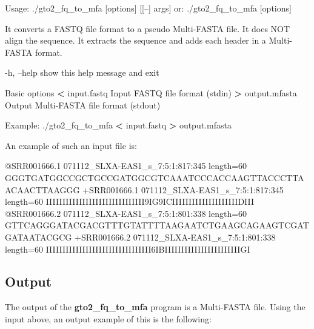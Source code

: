 \documentclass[11pt,]{krantz}
\newenvironment{Shaded}{\begin{snugshade}}{\end{snugshade}}
\newcommand{\OperatorTok}[1]{\textcolor[rgb]{0.43,0.43,0.43}{\textbf{#1}}}
\newcommand{\ExtensionTok}[1]{#1}
\newcommand{\NormalTok}[1]{#1}
\begin{document}
\begin{Shaded}
\begin{Highlighting}[]
\ExtensionTok{Usage}\NormalTok{: ./gto2_fq_to_mfa [options] [[--] args]}
   \ExtensionTok{or}\NormalTok{: ./gto2_fq_to_mfa [options]}

\ExtensionTok{It}\NormalTok{ converts a FASTQ file format to a pseudo Multi-FASTA file.}
\ExtensionTok{It}\NormalTok{ does NOT align the sequence.}
\ExtensionTok{It}\NormalTok{ extracts the sequence and adds each header in a Multi-FASTA format.}

    \ExtensionTok{-h}\NormalTok{, --help            show this help message and exit}

\ExtensionTok{Basic}\NormalTok{ options}
    \OperatorTok{<} \ExtensionTok{input.fastq}\NormalTok{         Input FASTQ file format (stdin)}
    \OperatorTok{>} \ExtensionTok{output.mfasta}\NormalTok{       Output Multi-FASTA file format (stdout)}

\ExtensionTok{Example}\NormalTok{: ./gto2_fq_to_mfa }\OperatorTok{<}\NormalTok{ input.fastq }\OperatorTok{>}\NormalTok{ output.mfasta}
\end{Highlighting}
\end{Shaded}

An example of such an input file is:

\begin{Shaded}
\begin{Highlighting}[]
\ExtensionTok{@SRR001666.1}\NormalTok{ 071112_SLXA-EAS1_s_7:5:1:817:345 length=60}
\ExtensionTok{GGGTGATGGCCGCTGCCGATGGCGTCAAATCCCACCAAGTTACCCTTAACAACTTAAGGG}
\ExtensionTok{+SRR001666.1}\NormalTok{ 071112_SLXA-EAS1_s_7:5:1:817:345 length=60}
\ExtensionTok{IIIIIIIIIIIIIIIIIIIIIIIIIIIIII9IG9ICIIIIIIIIIIIIIIIIIIIIDIII}
\ExtensionTok{@SRR001666.2}\NormalTok{ 071112_SLXA-EAS1_s_7:5:1:801:338 length=60}
\ExtensionTok{GTTCAGGGATACGACGTTTGTATTTTAAGAATCTGAAGCAGAAGTCGATGATAATACGCG}
\ExtensionTok{+SRR001666.2}\NormalTok{ 071112_SLXA-EAS1_s_7:5:1:801:338 length=60}
\ExtensionTok{IIIIIIIIIIIIIIIIIIIIIIIIIIIIIIII6IBIIIIIIIIIIIIIIIIIIIIIIIGI}
\end{Highlighting}
\end{Shaded}

\subsection*{Output}\label{output-1}


The output of the \textbf{gto2\_fq\_to\_mfa} program is a Multi-FASTA
file. Using the input above, an output example of this is the following:
\end{document}
